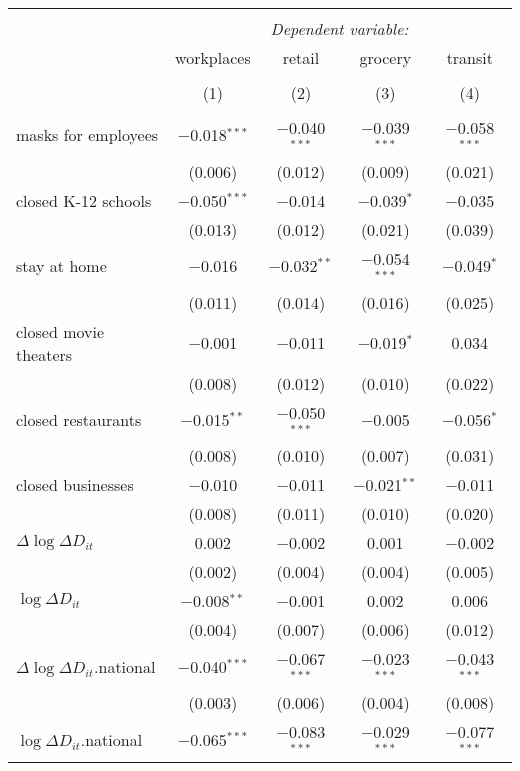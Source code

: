 \begin{tabular}{@{\extracolsep{1pt}}lcccc} 
\\[-1.8ex]\hline 
\hline \\[-1.8ex] 
 & \multicolumn{4}{c}{\textit{Dependent variable:}} \\ 
\cline{2-5} 
 & workplaces & retail & grocery & transit \\ 
\\[-1.8ex] & (1) & (2) & (3) & (4)\\ 
\hline \\[-1.8ex] 
 masks for employees & $-$0.018$^{***}$ & $-$0.040$^{***}$ & $-$0.039$^{***}$ & $-$0.058$^{***}$ \\ 
  & (0.006) & (0.012) & (0.009) & (0.021) \\ 
  closed K-12 schools & $-$0.050$^{***}$ & $-$0.014 & $-$0.039$^{*}$ & $-$0.035 \\ 
  & (0.013) & (0.012) & (0.021) & (0.039) \\ 
  stay at home & $-$0.016 & $-$0.032$^{**}$ & $-$0.054$^{***}$ & $-$0.049$^{*}$ \\ 
  & (0.011) & (0.014) & (0.016) & (0.025) \\ 
  closed movie theaters & $-$0.001 & $-$0.011 & $-$0.019$^{*}$ & 0.034 \\ 
  & (0.008) & (0.012) & (0.010) & (0.022) \\ 
  closed restaurants & $-$0.015$^{**}$ & $-$0.050$^{***}$ & $-$0.005 & $-$0.056$^{*}$ \\ 
  & (0.008) & (0.010) & (0.007) & (0.031) \\ 
  closed businesses & $-$0.010 & $-$0.011 & $-$0.021$^{**}$ & $-$0.011 \\ 
  & (0.008) & (0.011) & (0.010) & (0.020) \\ 
  $\Delta \log \Delta D_{it}$ & 0.002 & $-$0.002 & 0.001 & $-$0.002 \\ 
  & (0.002) & (0.004) & (0.004) & (0.005) \\ 
  $\log \Delta D_{it}$ & $-$0.008$^{**}$ & $-$0.001 & 0.002 & 0.006 \\ 
  & (0.004) & (0.007) & (0.006) & (0.012) \\ 
  $\Delta \log \Delta D_{it}$.national & $-$0.040$^{***}$ & $-$0.067$^{***}$ & $-$0.023$^{***}$ & $-$0.043$^{***}$ \\ 
  & (0.003) & (0.006) & (0.004) & (0.008) \\ 
  $\log \Delta D_{it}$.national & $-$0.065$^{***}$ & $-$0.083$^{***}$ & $-$0.029$^{***}$ & $-$0.077$^{***}$ \\ 

\end{tabular}
